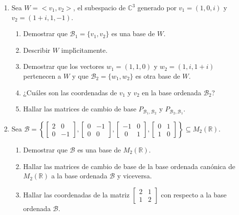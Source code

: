 \begin{enumerate}[topsep=6pt, itemsep=.4cm]
\item Sea $W=<v_1,v_2>$, el subespacio de $\mathbb{C}^3$
generado por $v_1=(1,0,i)$ y $v_2=(1+i,1,-1)$.
\begin{enumerate}
    \item Demostrar que $\mathcal{B}_1=\{v_1,v_2\}$ es una base de $W$.
    \item Describir $W$ impl{\'\i}citamente.
    \item Demostrar que los vectores $w_1=(1,1,0)$ y
    $w_2=(1,i,1+i)$ pertenecen a $W$ y que $\mathcal{B}_2=\{w_1,w_2\}$
    es otra base de $W$.
    \item  ¿Cu{\'a}les son las coordenadas de $v_1$ y $v_2$ en la
    base ordenada $\mathcal{B}_2$?
    \item Hallar las matrices de cambio de base
    $P_{\mathcal{B}_1,\mathcal{B}_2}$ y $P_{\mathcal{B}_2,\mathcal{B}_1}$.
\end{enumerate}


\item Sea $\mathcal{B}=
\left\{
\begin{bmatrix}
2 & 0\\
0 & -1
\end{bmatrix},
\begin{bmatrix}
0& -1\\
0& 0
\end{bmatrix},
\begin{bmatrix}
-1 &0\\
\; 0 & 1
\end{bmatrix},
\begin{bmatrix}
0 &1 \\
1 &0
\end{bmatrix}
\right\} \subseteq M_2(\mathbb R)$.



\begin{enumerate}
    \item Demostrar que $\mathcal{B}$ es una base de $M_2(\mathbb R)$.
    

    \item Hallar las matrices de cambio de base de la base ordenada can\'onica de $M_2(\mathbb R)$ a la base ordenada $\mathcal{B}$ y viceversa.
        
    \item Hallar las coordenadas de la matriz
    $
    \begin{bmatrix}
    2 & 1\\
    1 & 2
    \end{bmatrix}$ con respecto a la base ordenada $\mathcal{B}$.
\end{enumerate}



\end{enumerate}
